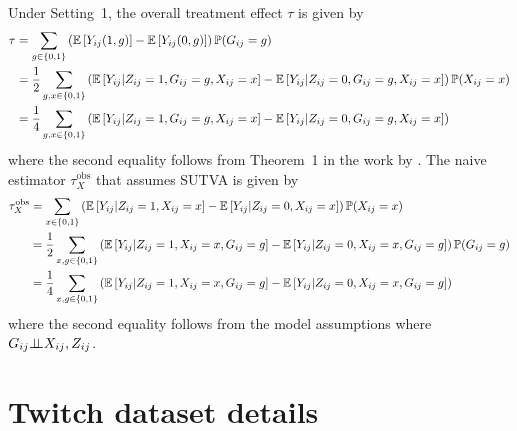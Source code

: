 \documentclass[10pt]{article}
\begin{document}
Under Setting~1, the overall treatment effect $\tau$ is given by
\begin{align*}
\tau %
&= \sum_{g\in\{0,1\}} \left(\E\left[Y_{ij}(1,g)\right] - \E\left[Y_{ij}(0,g)\right]\right)\P(G_{ij}=g) \\
&= \frac{1}{2}\sum_{g,x\in\{0,1\}} \left(\E\left[Y_{ij}|Z_{ij}=1,G_{ij}=g,X_{ij}=x\right] - \E\left[Y_{ij}|Z_{ij}=0,G_{ij}=g,X_{ij}=x\right]\right)\P(X_{ij}=x) \\
&= \frac{1}{4}\sum_{g,x\in\{0,1\}} \left(\E\left[Y_{ij}|Z_{ij}=1,G_{ij}=g,X_{ij}=x\right] - \E\left[Y_{ij}|Z_{ij}=0,G_{ij}=g,X_{ij}=x\right]\right)
\end{align*}
where the second equality follows from Theorem~1 in the work by \textcite{Forastiere:2021}. The naive estimator $\tau_{X}^\text{obs}$ that assumes SUTVA is given by
\begin{align*}
\tau_{X}^\text{obs} &=
\sum_{x\in\{0,1\}}\left(\mathbb{E}\left[Y_{ij}|Z_{ij}=1,X_{ij}=x\right] - \mathbb{E}\left[Y_{ij}|Z_{ij}=0,X_{ij}=x\right]\right)\mathbb{P}(X_{ij}=x) \\
&= \frac{1}{2}\sum_{x,g\in\{0,1\}}\left(\mathbb{E}\left[Y_{ij}|Z_{ij}=1,X_{ij}=x,G_{ij}=g\right] - \mathbb{E}\left[Y_{ij}|Z_{ij}=0,X_{ij}=x,G_{ij}=g\right]\right)\mathbb{P}(G_{ij}=g) \\
&= \frac{1}{4}\sum_{x,g\in\{0,1\}}\left(\mathbb{E}\left[Y_{ij}|Z_{ij}=1,X_{ij}=x,G_{ij}=g\right] - \mathbb{E}\left[Y_{ij}|Z_{ij}=0,X_{ij}=x,G_{ij}=g\right]\right)
\end{align*}
where the second equality follows from the model assumptions where $G_{ij}{\perp\!\!\!\perp} X_{ij}, Z_{ij}$.



\newpage



\section{Twitch dataset details}\label{apx:twitch}
\end{document}
